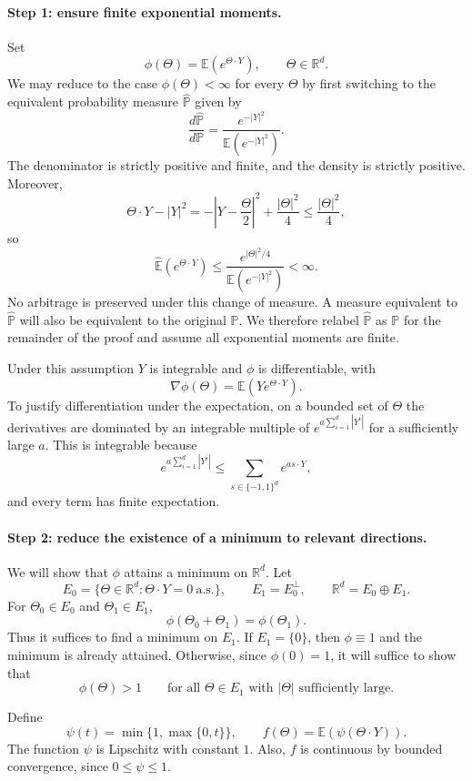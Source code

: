 \documentclass[11pt,a4paper]{article}
\begin{document}
\paragraph{Step 1: ensure finite exponential moments.}
Set
\[
\phi(\Theta)=\mathbb E\!\left(e^{\Theta\cdot Y}\right),
\qquad \Theta\in\mathbb R^d.
\]
We may reduce to the case $\phi(\Theta)<\infty$ for every $\Theta$ by
first switching to the equivalent probability measure
$\widehat{\mathbb P}$ given by
\[
\frac{d\widehat{\mathbb P}}{d\mathbb P}
=\frac{e^{-|Y|^2}}{\mathbb E(e^{-|Y|^2})}.
\]
The denominator is strictly positive and finite, and the density is
strictly positive. Moreover,
\[
\Theta\cdot Y-|Y|^2
=-\left|Y-\frac{\Theta}{2}\right|^2+\frac{|\Theta|^2}{4}
\leq\frac{|\Theta|^2}{4},
\]
so
\[
\widehat{\mathbb E}\!\left(e^{\Theta\cdot Y}\right)
\leq\frac{e^{|\Theta|^2/4}}{\mathbb E(e^{-|Y|^2})}<\infty.
\]
No arbitrage is preserved under this change of measure. A measure
equivalent to $\widehat{\mathbb P}$ will also be equivalent to the
original $\mathbb P$. We therefore relabel $\widehat{\mathbb P}$ as
$\mathbb P$ for the remainder of the proof and assume all exponential
moments are finite.

Under this assumption $Y$ is integrable and $\phi$ is differentiable,
with
\[
\nabla\phi(\Theta)
=\mathbb E\!\left(Y e^{\Theta\cdot Y}\right).
\]
To justify differentiation under the expectation, on a bounded set of
$\Theta$ the derivatives are dominated by an integrable multiple of
$e^{a\sum_{i=1}^d|Y^i|}$ for a sufficiently large $a$. This is integrable
because
\[
e^{a\sum_{i=1}^d|Y^i|}
\leq\sum_{s\in\{-1,1\}^d}e^{a s\cdot Y},
\]
and every term has finite expectation.

\paragraph{Step 2: reduce the existence of a minimum to relevant directions.}
We will show that $\phi$ attains a minimum on $\mathbb R^d$.
Let
\[
E_0=\{\Theta\in\mathbb R^d:\Theta\cdot Y=0\ \text{a.s.}\},
\qquad E_1=E_0^\perp,
\qquad \mathbb R^d=E_0\oplus E_1.
\]
For $\Theta_0\in E_0$ and $\Theta_1\in E_1$,
\[
\phi(\Theta_0+\Theta_1)=\phi(\Theta_1).
\]
Thus it suffices to find a minimum on $E_1$. If $E_1=\{0\}$, then
$\phi\equiv1$ and the minimum is already attained. Otherwise, since
$\phi(0)=1$, it will suffice to show that
\[
\phi(\Theta)>1
\qquad\text{for all }\Theta\in E_1\text{ with }|\Theta|
\text{ sufficiently large}.
\]

Define
\[
\psi(t)=\min\{1,\max\{0,t\}\},\qquad
f(\Theta)=\mathbb E\!\left(\psi(\Theta\cdot Y)\right).
\]
The function $\psi$ is Lipschitz with constant $1$. Also, $f$ is
continuous by bounded convergence, since $0\leq\psi\leq1$.
\end{document}
